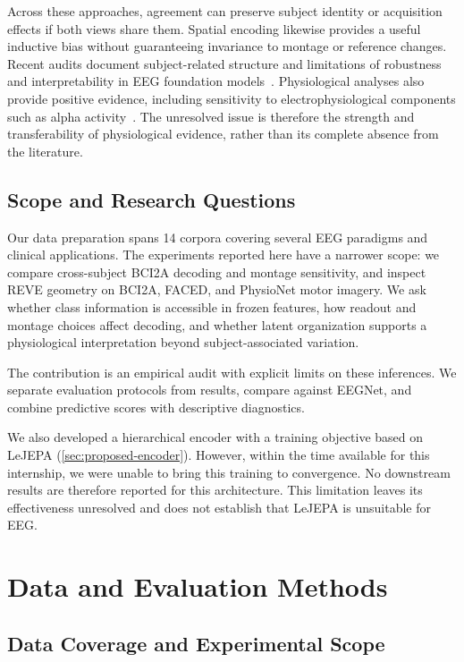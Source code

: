 \documentclass{article}
\begin{document}
Across these approaches, agreement can preserve subject identity or
acquisition effects if both views share them. Spatial encoding likewise
provides a useful inductive bias without guaranteeing invariance to montage
or reference changes. Recent audits document subject-related structure and
limitations of robustness and interpretability in EEG foundation
models~\cite{lin2026identity,sirca2026beyond}. Physiological analyses also
provide positive evidence, including sensitivity to electrophysiological
components such as alpha activity~\cite{ogg2025features}. The unresolved
issue is therefore the strength and transferability of physiological
evidence, rather than its complete absence from the literature.

\subsection{Scope and Research Questions}

Our data preparation spans 14 corpora covering several EEG paradigms and
clinical applications. The experiments reported here have a narrower scope:
we compare cross-subject BCI2A decoding and montage sensitivity, and inspect
REVE geometry on BCI2A, FACED, and PhysioNet motor imagery. We ask whether
class information is accessible in frozen features, how readout and montage
choices affect decoding, and whether latent organization supports a
physiological interpretation beyond subject-associated variation.

The contribution is an empirical audit with explicit limits on these
inferences. We separate evaluation protocols from results, compare against
EEGNet, and combine predictive scores with descriptive diagnostics.

We also developed a hierarchical encoder with a training objective based
on LeJEPA (\cref{sec:proposed-encoder}). However, within the time available
for this internship, we were unable to bring this training to convergence.
No downstream results are therefore reported for this architecture.
This limitation leaves its effectiveness unresolved and does not establish
that LeJEPA is unsuitable for EEG.

\section{Data and Evaluation Methods}
\label{sec:methodology}

\subsection{Data Coverage and Experimental Scope}
\label{sec:data}
\end{document}
